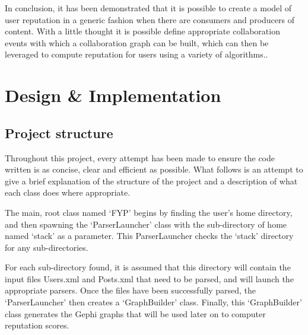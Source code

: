 \documentclass[]{final_report}
\begin{document}
In conclusion, it has been demonstrated that it is possible to create a model of user reputation in a generic fashion when there are consumers and producers of content. With a little thought it is possible define appropriate collaboration events with which a collaboration graph can be built, which can then be leveraged to compute reputation for users using a variety of algorithms.. 

\chapter{Design \& Implementation}


\section{Project structure}

Throughout this project, every attempt has been made to ensure the code written is as concise, clear and efficient as possible. What follows is an attempt to give a brief explanation of the structure of the project and a description of what each class does where appropriate. 

The main, root class named `FYP' begins by finding the user's home directory, and then spawning the `ParserLauncher' class with the sub-directory of home named `stack' as a parameter. This ParserLauncher checks the `stack' directory for any sub-directories. 

For each sub-directory found, it is assumed that this directory will contain the input files Users.xml and Posts.xml that need to be parsed, and will launch the appropriate parsers. Once the files have been successfully parsed, the `ParserLauncher' then creates a `GraphBuilder' class. Finally, this `GraphBuilder' class generates the Gephi graphs that will be used later on to computer reputation scores.
\end{document}
